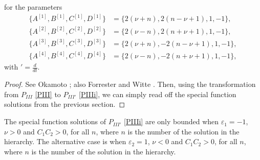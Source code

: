 \documentclass[12pt]{article}
\numberwithin{figure}{section}
\numberwithin{equation}{section}
\numberwithin{table}{section}
\begin{document}
for the parameters
\begin{subequations}
\begin{align*}
\{A^{[1]},B^{[1]},C^{[1]},D^{[1]}\}&=\{2(\nu+n),2(n-\nu+1),1,-1\},\\
\{A^{[2]},B^{[2]},C^{[2]},D^{[2]}\}&=\{2(\nu-n),2(n+\nu+1),1,-1\},\\
\{A^{[3]},B^{[3]},C^{[3]},D^{[3]}\}&=\{2(\nu+n),-2(n-\nu+1),1,-1\},\\
\{A^{[4]},B^{[4]},C^{[4]},D^{[4]}\}&=\{2(\nu-n),-2(n+\nu+1),1,-1\},
\end{align*}
\end{subequations}
with $'=\frac{d}{dt}.$
\begin{proof}
See Okamoto \cite{P:275:221}; also Forrester and Witte \cite{P:219:357}. Then, using the transformation from $P_{III}$ \eqref{PIII} to $P_{III'}$ \eqref{PIIIi}, we can simply read off the special function solutions from the previous section.
\end{proof}
The special function solutions of $P_{III'}$ \eqref{PIIIi} are only bounded when $\varepsilon_1=-1$, $\nu>0$ and $C_1C_2>0$, for all $n$, where $n$ is the number of the solution in the hierarchy. The alternative case is when $\varepsilon_2=1$, $\nu<0$ and $C_1C_2>0$, for all $n$, where $n$ is the number of the solution in the hierarchy.
\end{document}
